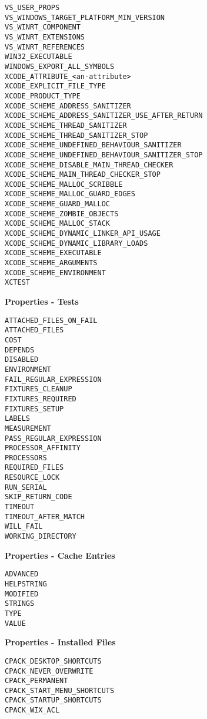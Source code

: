 \documentclass{article}
\begin{document}
\begin{minipage}[t]{0.18\linewidth}
\begin{verbatim}
VS_USER_PROPS
VS_WINDOWS_TARGET_PLATFORM_MIN_VERSION
VS_WINRT_COMPONENT
VS_WINRT_EXTENSIONS
VS_WINRT_REFERENCES
WIN32_EXECUTABLE
WINDOWS_EXPORT_ALL_SYMBOLS
XCODE_ATTRIBUTE_<an-attribute>
XCODE_EXPLICIT_FILE_TYPE
XCODE_PRODUCT_TYPE
XCODE_SCHEME_ADDRESS_SANITIZER
XCODE_SCHEME_ADDRESS_SANITIZER_USE_AFTER_RETURN
XCODE_SCHEME_THREAD_SANITIZER
XCODE_SCHEME_THREAD_SANITIZER_STOP
XCODE_SCHEME_UNDEFINED_BEHAVIOUR_SANITIZER
XCODE_SCHEME_UNDEFINED_BEHAVIOUR_SANITIZER_STOP
XCODE_SCHEME_DISABLE_MAIN_THREAD_CHECKER
XCODE_SCHEME_MAIN_THREAD_CHECKER_STOP
XCODE_SCHEME_MALLOC_SCRIBBLE
XCODE_SCHEME_MALLOC_GUARD_EDGES
XCODE_SCHEME_GUARD_MALLOC
XCODE_SCHEME_ZOMBIE_OBJECTS
XCODE_SCHEME_MALLOC_STACK
XCODE_SCHEME_DYNAMIC_LINKER_API_USAGE
XCODE_SCHEME_DYNAMIC_LIBRARY_LOADS
XCODE_SCHEME_EXECUTABLE
XCODE_SCHEME_ARGUMENTS
XCODE_SCHEME_ENVIRONMENT
XCTEST
\end{verbatim}

\textbf{Properties - Tests}
\begin{verbatim}
ATTACHED_FILES_ON_FAIL
ATTACHED_FILES
COST
DEPENDS
DISABLED
ENVIRONMENT
FAIL_REGULAR_EXPRESSION
FIXTURES_CLEANUP
FIXTURES_REQUIRED
FIXTURES_SETUP
LABELS
MEASUREMENT
PASS_REGULAR_EXPRESSION
PROCESSOR_AFFINITY
PROCESSORS
REQUIRED_FILES
RESOURCE_LOCK
RUN_SERIAL
SKIP_RETURN_CODE
TIMEOUT
TIMEOUT_AFTER_MATCH
WILL_FAIL
WORKING_DIRECTORY
\end{verbatim}

\textbf{Properties - Cache Entries}
\begin{verbatim}
ADVANCED
HELPSTRING
MODIFIED
STRINGS
TYPE
VALUE
\end{verbatim}

\textbf{Properties - Installed Files}
\begin{verbatim}
CPACK_DESKTOP_SHORTCUTS
CPACK_NEVER_OVERWRITE
CPACK_PERMANENT
CPACK_START_MENU_SHORTCUTS
CPACK_STARTUP_SHORTCUTS
CPACK_WIX_ACL
\end{verbatim}
\end{minipage}

\pagebreak
\end{document}
